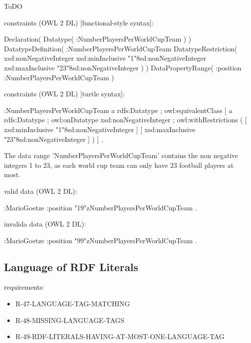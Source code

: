 \documentclass{llncs}
\begin{document}
\begin{ex}
ToDO
\end{ex}

constraints (OWL 2 DL) [functional-style syntax]:

\begin{ex}
Declaration( Datatype( :NumberPlayersPerWorldCupTeam ) ) 
DatatypeDefinition( 
    :NumberPlayersPerWorldCupTeam
    DatatypeRestriction( 
        xsd:nonNegativeInteger 
        xsd:minInclusive "1"^^xsd:nonNegativeInteger 
        xsd:maxInclusive "23"^^xsd:nonNegativeInteger ) )     
DataPropertyRange( :position :NumberPlayersPerWorldCupTeam ) 
\end{ex}

constraints (OWL 2 DL) [turtle syntax]:

\begin{ex}
:NumberPlayersPerWorldCupTeam
    a rdfs:Datatype ;
    owl:equivalentClass [
        a rdfs:Datatype ;
        owl:onDatatype xsd:nonNegativeInteger ;
        owl:withRestrictions ( 
            [ xsd:minInclusive "1"^^xsd:nonNegativeInteger ]
            [ xsd:maxInclusive "23"^^xsd:nonNegativeInteger ] ) ] .
\end{ex}

The data range 'NumberPlayersPerWorldCupTeam' contains the non negative integers 1 to 23, as each world cup team can only have 23 football players at most.

valid data (OWL 2 DL):

\begin{ex}
:MarioGoetze
    :position "19"^^:NumberPlayersPerWorldCupTeam .
\end{ex}

invalida data (OWL 2 DL):

\begin{ex}
:MarioGoetze
    :position "99"^^:NumberPlayersPerWorldCupTeam .
\end{ex}

\subsection{Language of RDF Literals}

requirements:

\begin{itemize}
	\item R-47-LANGUAGE-TAG-MATCHING
  \item R-48-MISSING-LANGUAGE-TAGS
	\item R-49-RDF-LITERALS-HAVING-AT-MOST-ONE-LANGUAGE-TAG
\end{itemize}
\end{document}
